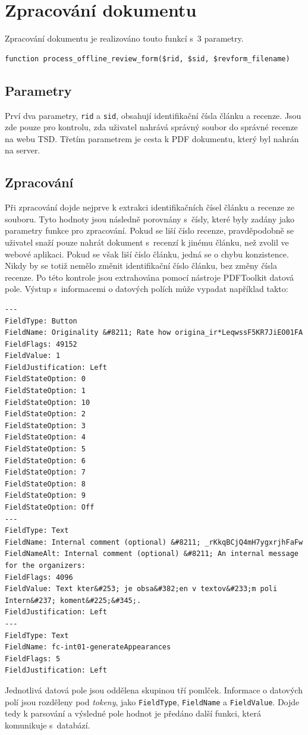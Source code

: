 \documentclass[czech,BP]{thesiskiv}
\begin{document}
\section{Zpracování dokumentu}
Zpracování dokumentu je realizováno touto funkcí s~3 parametry.
\begin{lstlisting}
function process_offline_review_form($rid, $sid, $revform_filename) 
\end{lstlisting}
\subsection{Parametry}
Prví dva parametry, \texttt{rid} a \texttt{sid}, obsahují identifikační čísla článku a recenze. Jsou zde pouze pro kontrolu, zda uživatel nahrává správný soubor do správné recenze na webu TSD. Třetím parametrem je cesta k PDF dokumentu, který byl nahrán na server.
\subsection{Zpracování}
Při zpracování dojde nejprve k extrakci identifikačních čísel článku a recenze ze souboru. Tyto hodnoty jsou následně porovnány s~čísly, které byly zadány jako parametry funkce pro zpracování. Pokud se liší číslo recenze, pravděpodobně se uživatel snaží pouze nahrát dokument s~recenzí k jinému článku, než zvolil ve webové aplikaci. Pokud se však liší číslo článku, jedná se o chybu konzistence. Nikdy by se totiž nemělo změnit identifikační číslo článku, bez změny čísla recenze. Po této kontrole jsou extrahována pomocí nástroje PDFToolkit datová pole. Výstup s~informacemi o datových polích může vypadat například takto:
\label{vystup}
\begin{lstlisting}[basicstyle=\footnotesize,caption={Ukázka výstupu nástroje PDFToolkit},label={lst:vystup}]
---
FieldType: Button
FieldName: Originality &#8211; Rate how origina_ir*LeqwssF5KR7JiEO01FA
FieldFlags: 49152
FieldValue: 1
FieldJustification: Left
FieldStateOption: 0
FieldStateOption: 1
FieldStateOption: 10
FieldStateOption: 2
FieldStateOption: 3
FieldStateOption: 4
FieldStateOption: 5
FieldStateOption: 6
FieldStateOption: 7
FieldStateOption: 8
FieldStateOption: 9
FieldStateOption: Off
---
FieldType: Text
FieldName: Internal comment (optional) &#8211; _rKkqBCjQ4mH7ygxrjhFaFw
FieldNameAlt: Internal comment (optional) &#8211; An internal message for the organizers:
FieldFlags: 4096
FieldValue: Text kter&#253; je obsa&#382;en v textov&#233;m poli Intern&#237; koment&#225;&#345;.
FieldJustification: Left
---
FieldType: Text
FieldName: fc-int01-generateAppearances
FieldFlags: 5
FieldJustification: Left
\end{lstlisting}
Jednotlivá datová pole jsou oddělena skupinou tří pomlček. Informace o datových polí jsou rozděleny pod \emph{tokeny}, jako \texttt{FieldType}, \texttt{FieldName} a \texttt{FieldValue}. Dojde tedy k parsování a výsledné pole hodnot je předáno další funkci, která komunikuje s~databází. 
\end{document}
